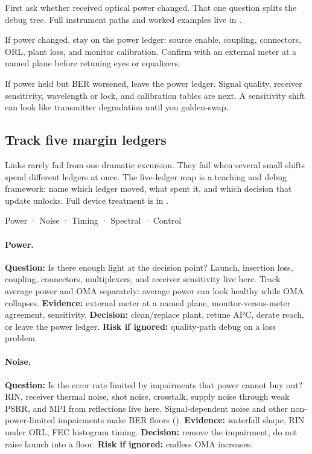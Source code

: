 First ask whether received optical power changed. That one question splits
the debug tree. Full instrument paths and worked examples live in
.

If power changed, stay on the power ledger: source enable, coupling,
connectors, ORL, plant loss, and monitor calibration. Confirm with an
external meter at a named plane before retuning eyes or equalizers.

If power held but BER worsened, leave the power ledger. Signal quality,
receiver sensitivity, wavelength or lock, and calibration tables are next.
A sensitivity shift can look like transmitter degradation until you
golden-swap.


\subsection{Track five margin ledgers}
\label{sec:interview-margin-ledgers}

Links rarely fail from one dramatic excursion. They fail when several small
shifts spend different ledgers at once. The five-ledger map is a teaching and
debug framework: name which ledger moved, what spent it, and which decision
that update unlocks. Full device treatment is in
.

\begin{dectree}
Power · Noise · Timing · Spectral · Control
\end{dectree}

\paragraph{Power.}
\textbf{Question:} Is there enough light at the decision point?
Launch, insertion loss, coupling, connectors, multiplexers, and receiver
sensitivity live here. Track average power and OMA separately:
average power can look healthy while OMA collapses. \textbf{Evidence:} external
meter at a named plane, monitor-versus-meter agreement, sensitivity.
\textbf{Decision:} clean/replace plant, retune APC, derate reach, or leave the
power ledger. \textbf{Risk if ignored:} quality-path debug on a loss problem.

\paragraph{Noise.}
\textbf{Question:} Is the error rate limited by impairments that power cannot
buy out?
RIN, receiver thermal noise, shot noise, crosstalk, supply noise
through weak PSRR, and MPI from reflections live here. Signal-dependent noise
and other non-power-limited impairments make BER floors
(). \textbf{Evidence:} waterfall shape, RIN under
ORL, FEC histogram timing. \textbf{Decision:} remove the impairment, do not
raise launch into a floor. \textbf{Risk if ignored:} endless OMA increases.

